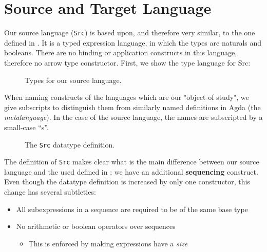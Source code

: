 \documentclass[a4paper]{article}
\begin{document}
    \section{Source and Target Language}
    \label{sec:basic}

        Our source language (\texttt{Src}) is based upon, and therefore very similar, to the one
        defined in \cite{typed-stack-safe-compiler}. It is a typed expression language, in which
        the types are naturals and booleans. There are no binding or application constructs
        in this language, therefore no arrow type constructor. First, we show the type language for
        Src:

        \begin{figure}[h!]
            \caption{Types for our source language.
                \label{lst:tys}
            }
        \end{figure}

        When naming constructs of the languages which are our "object of study", we give
        subscripts to distinguish them from similarly named definitions in Agda (the \emph{metalanguage}).
        In the case of the source language, the names are subscripted by a small-case ``s''.

        \begin{figure}[h!]
            \caption{
                The \texttt{Src} datatype definition.
                \label{lst:src}
            }
        \end{figure}

        The definition of \texttt{Src} makes clear what is the main difference between our source language
        and the used defined in \cite{typed-stack-safe-compiler}: we have an additional \textbf{sequencing}
        construct. Even though the datatype definition is increased by only one constructor,
        this change has several subtleties:

        \begin{itemize}
            \item All subexpressions in a sequence are required to be of the same base type
            \item No arithmetic or boolean operators over sequences
                \begin{itemize}
                    \item This is enforced by making expressions have a \emph{size}
                \end{itemize}
        \end{itemize}
\end{document}
